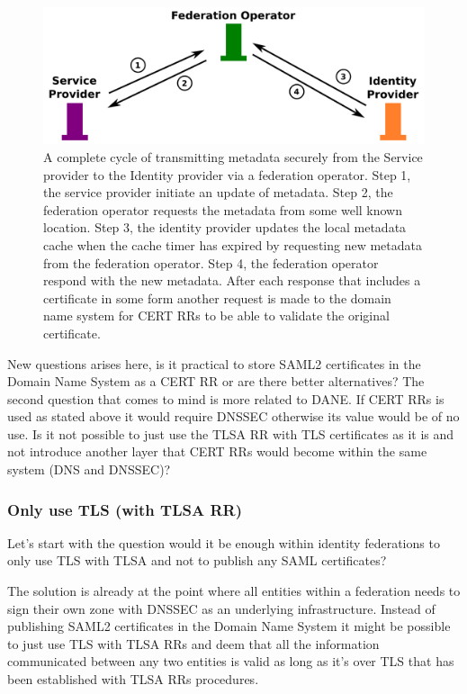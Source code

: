 \begin{figure}[ht]
\begin{center}
\includegraphics[scale=1]{Figures/saml2certsascertrr.png}
\end{center}
\caption{A complete cycle of transmitting metadata securely from the Service provider to the Identity provider via a federation operator.
Step 1, the service provider initiate an update of metadata.
Step 2, the federation operator requests the metadata from some well known location.
Step 3, the identity provider updates the local metadata cache when the cache timer has expired by requesting new metadata from the federation operator.
Step 4, the federation operator respond with the new metadata.
After each response that includes a certificate in some form another request is made to the domain name system for CERT RRs to be able to validate the original certificate.
\label{ch4:saml2certsascertrr}}
\end{figure}



New questions arises here, is it practical to store SAML2 certificates in the Domain Name System as a CERT RR 
or are there better alternatives?
The second question that comes to mind is more related to DANE.
If CERT RRs is used as stated above it would require DNSSEC otherwise its value would be of no use.
Is it not possible to just use the TLSA RR with TLS certificates as it is and not introduce another layer that CERT RRs would become within the same system (DNS and DNSSEC)?

\subsubsection{Only use TLS (with TLSA RR)}
\label{subsec:only-tlsa-rr-with-tls}
Let's start with the question would it be enough within identity federations to only use TLS with TLSA and not to publish any SAML certificates?

The solution is already at the point where all entities within a federation needs to sign their own zone with DNSSEC as an underlying infrastructure.
Instead of publishing SAML2 certificates in the Domain Name System it might be possible to just use TLS with TLSA RRs and deem that all the information communicated between any two entities is valid as long as it's over TLS that has been established with TLSA RRs procedures.

